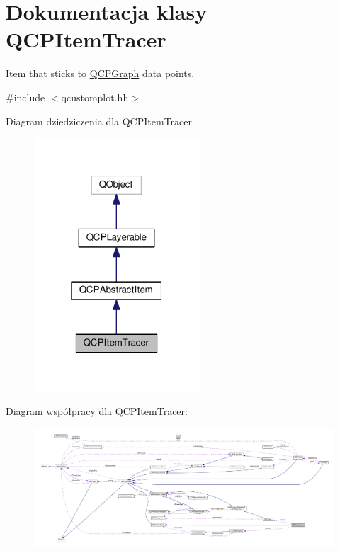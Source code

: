 \hypertarget{class_q_c_p_item_tracer}{}\section{Dokumentacja klasy Q\+C\+P\+Item\+Tracer}
\label{class_q_c_p_item_tracer}


Item that sticks to \hyperlink{class_q_c_p_graph}{Q\+C\+P\+Graph} data points.  




{\ttfamily \#include $<$qcustomplot.\+hh$>$}



Diagram dziedziczenia dla Q\+C\+P\+Item\+Tracer\nopagebreak
\begin{figure}[H]
\begin{center}
\leavevmode
\includegraphics[width=175pt]{class_q_c_p_item_tracer__inherit__graph}
\end{center}
\end{figure}


Diagram współpracy dla Q\+C\+P\+Item\+Tracer\+:\nopagebreak
\begin{figure}[H]
\begin{center}
\leavevmode
\includegraphics[width=350pt]{class_q_c_p_item_tracer__coll__graph}
\end{center}
\end{figure}
